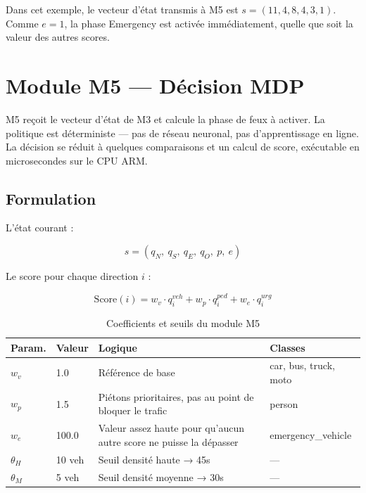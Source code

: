 Dans cet exemple, le vecteur d'état
transmis à M5 est $s = (11, 4, 8, 4, 3, 1)$.
Comme $e = 1$, la phase Emergency est
activée immédiatement, quelle que soit
la valeur des autres scores.

\section{Module M5 — Décision MDP}

M5 reçoit le vecteur d'état de M3 et
calcule la phase de feux à activer.
La politique est déterministe — pas
de réseau neuronal, pas d'apprentissage
en ligne. La décision se réduit à
quelques comparaisons et un calcul
de score, exécutable en microsecondes
sur le CPU ARM.

\subsection{Formulation}

L'état courant :

\begin{equation}
s = (q_N,\ q_S,\ q_E,\ q_O,\ p,\ e)
\label{eq:state_m5}
\end{equation}

Le score pour chaque direction $i$ :

\begin{equation}
\text{Score}(i) =
w_v \cdot q_i^{veh}
+ w_p \cdot q_i^{ped}
+ w_e \cdot q_i^{urg}
\label{eq:scoring}
\end{equation}

\begin{table}[H]
\centering
\caption{Coefficients et seuils du module M5}
\begin{tabularx}{\textwidth}{llXl}
\toprule
\textbf{Param.} &
\textbf{Valeur} &
\textbf{Logique} &
\textbf{Classes} \\
\midrule
$w_v$ & 1.0 &
Référence de base &
car, bus, truck, moto \\
$w_p$ & 1.5 &
Piétons prioritaires, pas
au point de bloquer le trafic &
person \\
$w_e$ & 100.0 &
Valeur assez haute pour
qu'aucun autre score ne
puisse la dépasser &
emergency\_vehicle \\
$\theta_H$ & 10 veh &
Seuil densité haute → 45s &
— \\
$\theta_M$ & 5 veh &
Seuil densité moyenne → 30s &
— \\
\bottomrule
\end{tabularx}
\label{tab:mdp_params}
\end{table}

